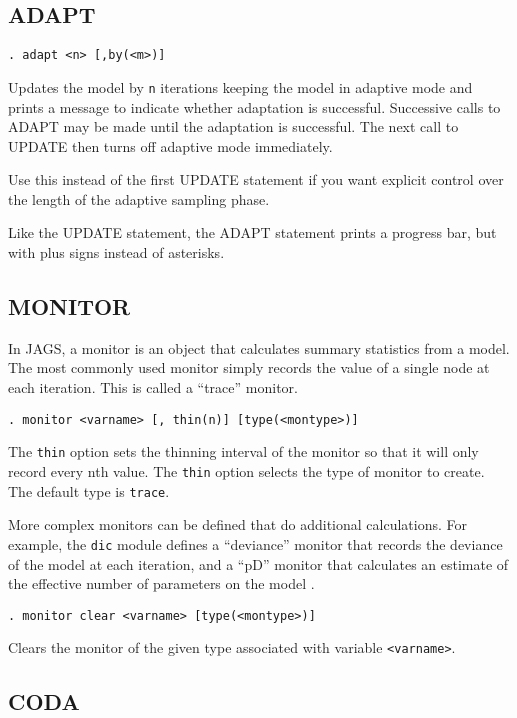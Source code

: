 \documentclass[11pt, a4paper, titlepage]{report}
\newcommand{\JAGS}{\textsf{JAGS}}
\begin{document}
\subsection{ADAPT}
\label{section:adapt}

\begin{verbatim}
. adapt <n> [,by(<m>)]
\end{verbatim}
Updates the model by \texttt{n} iterations keeping the model in
adaptive mode and prints a message to indicate whether adaptation is
successful.  Successive calls to ADAPT may be made until the
adaptation is successful. The next call to UPDATE then turns off
adaptive mode immediately.

Use this instead of the first UPDATE statement if you want explicit
control over the length of the adaptive sampling phase.

Like the UPDATE statement, the ADAPT statement prints a progress
bar, but with plus signs instead of asterisks.

\subsection{MONITOR}
\label{section:monitor}

In \JAGS, a monitor is an object that calculates summary statistics
from a model.  The most commonly used monitor simply records the value
of a single node at each iteration.  This is called a ``trace''
monitor. 
\begin{verbatim}
. monitor <varname> [, thin(n)] [type(<montype>)]
\end{verbatim}
The \texttt{thin} option sets the thinning interval of the monitor so
that it will only record every nth value. The \texttt{thin} option 
selects the type of monitor to create. The default type is \texttt{trace}.

More complex monitors can be defined that do additional calculations.
For example, the \verb+dic+ module defines a ``deviance'' monitor that
records the deviance of the model at each iteration, and a ``pD''
monitor that calculates an estimate of the effective number of
parameters on the model \cite{spiegelhalter:etal:2002}.  

\begin{verbatim}
. monitor clear <varname> [type(<montype>)]
\end{verbatim}
Clears the monitor of the given type associated with variable
\texttt{<varname>}. 

\subsection{CODA}
\label{coda}
\end{document}
